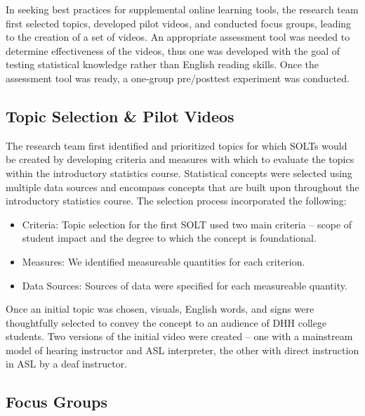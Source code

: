 \documentclass[11.5pt]{sig-alternate} %
\begin{document}
\begin{large}
In seeking best practices for supplemental online learning tools, the research team first selected topics, developed pilot videos, and conducted focus groups, leading to the creation of a set of videos. An appropriate assessment tool was needed to determine effectiveness of the videos, thus one was developed with the goal of testing statistical knowledge rather than English reading skills. Once the assessment tool was ready, a one-group pre/posttest experiment was conducted.

\subsection*{Topic Selection \& Pilot Videos}

The research team first identified and prioritized topics for which SOLTs would be created by developing criteria and measures with which to evaluate the topics within the introductory statistics course. Statistical concepts were selected using multiple data sources and encompass concepts that are built upon throughout the introductory statistics course. The selection process incorporated the following:

\begin{itemize}
    \item Criteria: Topic selection for the first SOLT used two main criteria – scope of student impact and the degree to which the concept is foundational.
    \item Measures: We identified measureable quantities for each criterion.
    \item Data Sources: Sources of data were specified for each measureable quantity.
\end{itemize}

Once an initial topic was chosen, visuals, English words, and signs were thoughtfully selected to convey the concept to an audience of DHH college students. Two versions of the initial video were created – one with a mainstream model of hearing instructor and ASL interpreter, the other with direct instruction in ASL by a deaf instructor.

\subsection*{Focus Groups}


\end{large}
\end{document}
